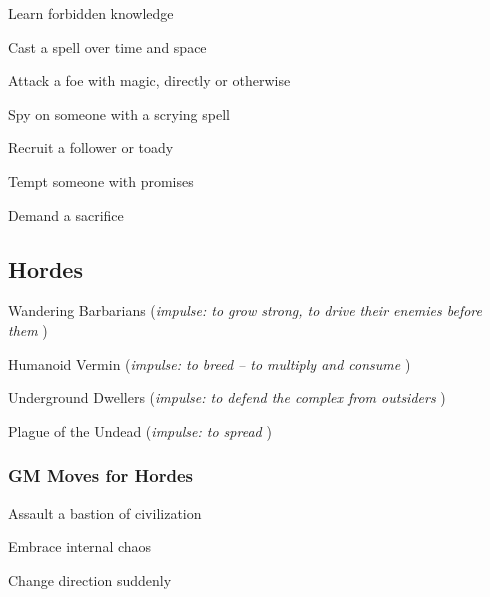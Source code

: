 \item Learn forbidden knowledge

 
\item Cast a spell over time and space

 
\item Attack a foe with magic, directly or otherwise

 
\item Spy on someone with a scrying spell

 
\item Recruit a follower or toady

 
\item Tempt someone with promises

 
\item Demand a sacrifice


\stopitemize
 
\subsection{Hordes}   
 
\startitemize[1,packed]

\item Wandering Barbarians ({\em impulse: to grow strong, to drive their enemies before them} )

 
\item Humanoid Vermin ({\em impulse: to breed – to multiply and consume} )

 
\item Underground Dwellers ({\em impulse: to defend the complex from outsiders} )

 
\item Plague of the Undead ({\em impulse: to spread} )


\stopitemize
 
\subsubsection{GM Moves for Hordes}     
 
\startitemize[1,packed]

\item Assault a bastion of civilization

 
\item Embrace internal chaos

 
\item Change direction suddenly

